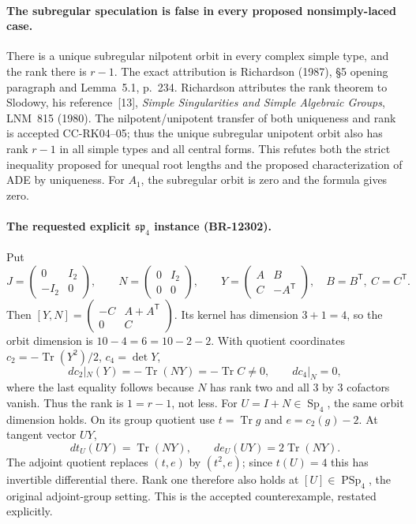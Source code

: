 \paragraph{The subregular speculation is false in every proposed
nonsimply-laced case.}
There is a unique subregular nilpotent orbit in every complex simple
type, and the rank there is $r-1$.  The exact attribution is
Richardson (1987), \S5 opening paragraph and Lemma~5.1, p.~234.
Richardson attributes the rank theorem to Slodowy, his reference~[13],
\emph{Simple Singularities and Simple Algebraic Groups}, LNM~815
(1980).  The nilpotent/unipotent transfer of both uniqueness and rank
is accepted CC-RK04--05; thus the unique subregular unipotent orbit
also has rank $r-1$ in all simple types and all central forms.
This refutes both the strict inequality proposed for unequal root
lengths and the proposed characterization of ADE by uniqueness.
For $A_1$, the subregular orbit is zero and the formula gives zero.

\paragraph{The requested explicit $\mathfrak{sp}_4$ instance
(BR-12302).}
Put
\[
 J=\begin{pmatrix}0&I_2\\-I_2&0\end{pmatrix},\qquad
 N=\begin{pmatrix}0&I_2\\0&0\end{pmatrix},\qquad
 Y=\begin{pmatrix}A&B\\C&-A^{\mathsf T}\end{pmatrix},
 \quad B=B^{\mathsf T},\ C=C^{\mathsf T}.
\]
Then $[Y,N]=\left(\begin{smallmatrix}-C&A+A^{\mathsf T}\\0&C
\end{smallmatrix}\right)$.  Its kernel has dimension $3+1=4$,
so the orbit dimension is $10-4=6=10-2-2$.  With quotient
coordinates $c_2=-\operatorname{Tr}(Y^2)/2$, $c_4=\det Y$,
\[
 dc_2|_N(Y)=-\operatorname{Tr}(NY)=-\operatorname{Tr}C\ne0,
 \qquad dc_4|_N=0,
\]
where the last equality follows because $N$ has rank two and all
$3$ by $3$ cofactors vanish.  Thus the rank is $1=r-1$, not less.
For $U=I+N\in\operatorname{Sp}_4$, the same orbit dimension holds.
On its group quotient use $t=\operatorname{Tr}g$ and
$e=c_2(g)-2$.  At tangent vector $UY$,
\[
 dt_U(UY)=\operatorname{Tr}(NY),\qquad
 de_U(UY)=2\operatorname{Tr}(NY).
\]
The adjoint quotient replaces $(t,e)$ by $(t^2,e)$; since $t(U)=4$
this has invertible differential there.  Rank one therefore also
holds at $[U]\in\operatorname{PSp}_4$, the original adjoint-group
setting.  This is the accepted counterexample, restated explicitly.

